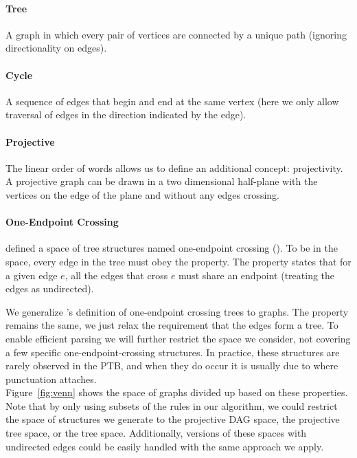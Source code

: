 \paragraph{Tree}
A graph in which every pair of vertices are connected by a unique path (ignoring directionality on edges).

\paragraph{Cycle}
A sequence of edges that begin and end at the same vertex (here we only allow traversal of edges in the direction indicated by the edge).

\paragraph{Projective}
The linear order of words allows us to define an additional concept: projectivity.
A projective graph can be drawn in a two dimensional half-plane with the vertices on the edge of the plane and without any edges crossing.

\paragraph{One-Endpoint Crossing}
\textcite{ec} defined a space of tree structures named one-endpoint crossing (\oneEC).
To be in the space, every edge in the tree must obey the \oneEC property.
The property states that for a given edge $e$, all the edges that cross $e$ must share an endpoint (treating the edges as undirected).

We generalize \textcite{ec}'s definition of one-endpoint crossing trees to graphs.
The \oneEC property remains the same, we just relax the requirement that the edges form a tree.
To enable efficient parsing we will further restrict the space we consider, not covering a few specific one-endpoint-crossing structures.
In practice, these structures are rarely observed in the PTB, and when they do occur it is usually due to where punctuation attaches. \\

Figure~\ref{fig:venn} shows the space of graphs divided up based on these properties.
Note that by only using subsets of the rules in our algorithm, we could restrict the space of structures we generate to the projective DAG space, the projective tree space, or the \oneEC tree space.
Additionally, versions of these spaces with undirected edges could be easily handled with the same approach we apply.


